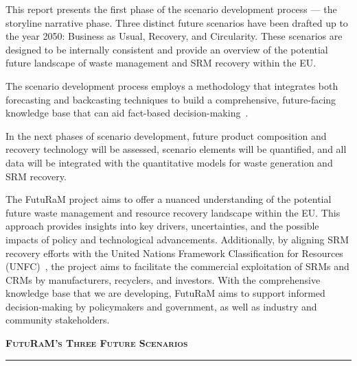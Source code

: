 \label{sec:executivesummary}

This report presents the first phase of the scenario development process — the storyline narrative phase. Three distinct future scenarios have been drafted up to the year 2050: Business as Usual, Recovery, and Circularity. These scenarios are designed to be internally consistent and provide an overview of the potential future landscape of waste management and SRM recovery within the EU.

The scenario development process employs a methodology that integrates both forecasting and backcasting techniques to build a comprehensive, future-facing knowledge base that can aid fact-based decision-making~\cite{dreborg1996essence, boerjeson2005scenariosreport, boerjeson2005scenariosarticle, amer2013, sardesai2021, lloyd2014objectivity, ardente2014}. 

In the next phases of scenario development, future product composition and recovery technology will be assessed, scenario elements will be quantified, and all data will be integrated with the quantitative models for waste generation and SRM recovery.

The FutuRaM project aims to offer a nuanced understanding of the potential future waste management and resource recovery landscape within the EU. This approach provides insights into key drivers, uncertainties, and the possible impacts of policy and technological advancements. Additionally, by aligning SRM recovery efforts with the United Nations Framework Classification for Resources (UNFC)~\cite{unfc2023}, the project aims to facilitate the commercial exploitation of SRMs and CRMs by manufacturers, recyclers, and investors. With the comprehensive knowledge base that we are developing, FutuRaM aims to support informed decision-making by policymakers and government, as well as industry and community stakeholders.


\vspace{2em}
\begin{center}
    {\Large\textbf{\textsc{FutuRaM's Three Future Scenarios}}} \\
    \rule{.6\textwidth}{2pt}
\end{center}

\vspace{1em}
    
